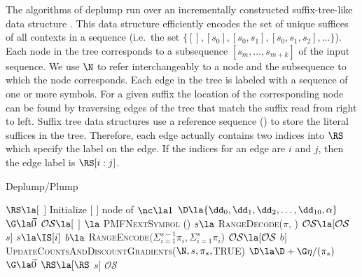 The algorithms of deplump run over an incrementally constructed suffix-tree-like data structure \citep{Ukkonen1992}. This data structure efficiently encodes the set of unique suffices of all contexts in a sequence (i.e.~the set $\{ [ ], [s_0], [s_0,s_1], [s_0, s_1,s_2], \ldots \}$).  Each node in the tree corresponds to a subsequence $[s_m, \ldots, s_{m + k}]$ of the input sequence.  We use $\N$ to refer interchangeably to a node and the subsequence to which the node corresponds.  Each edge in the tree is labeled with a sequence of one or more symbols. For a given suffix the location of the corresponding node can be found by traversing edges of the tree that match the suffix read from right to left. Suffix tree data structures use a reference sequence (\RS) to store the literal suffices in the tree.  Therefore, each edge actually contains two indices into $\RS$ which specify the label on the edge. If the indices for an edge are $i$ and $j$, then the edge label is $\RS[i : j]$.

\begin{algorithm}[t]
    \caption{Deplump/Plump} \label{alg:deplump/plump}
    \begin{algorithmic}[1]
		\State $\RS \la [$ $]  $ 
		\State Initialize $[$ $]$ node of \T {}
		\State $\nc \la 1$ 
		\State $\D \la  \{ \dd_0, \dd_1, \dd_2, \dots, \dd_{10}, \alpha \}$ 
		\State $\G \la \vec 0$ 
		\State $\mathcal{O}\mathcal{S} \la  [$ $]$ 
			\State [$\pi$, \N] $\la$ \textsc{PMFNextSymbol} (\RS)
				\State $s \la $ \textsc{RangeDecode}($\pi$, \IS)
				\State $\mathcal{O}\mathcal{S} \la [\mathcal{O}\mathcal{S}$ $s]$
			\Else
				\State $s \la \IS[i]$
				\State $b \la$ \textsc{RangeEncode}$(\Sigma_{i = 1}^{s-1} \pi_i, \Sigma_{i = 1}^{s} \pi_i$)
				\State $\mathcal{O}\mathcal{S} \la [\mathcal{O}\mathcal{S}$ $b]$		
			\EndIf
			\State \textsc{UpdateCountsAndDiscountGradients}($\N,s,\pi_s,$TRUE)
			\State $\D \la \D + \G \eta / (\pi_s)$ 
			\State $\G \la \vec 0$ 
			\State $\RS \la [\RS$ $s]$ 
		\EndFor
		\State \Return $\mathcal{O}\mathcal{S}$
	\EndProcedure
	\end{algorithmic}
\end{algorithm}

